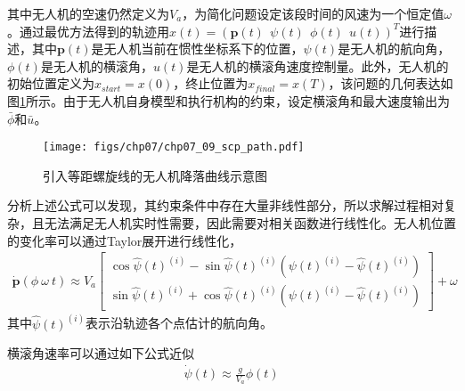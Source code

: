 其中无人机的空速仍然定义为$V_a$，为简化问题设定该段时间的风速为一个恒定值$\omega$。通过最优方法得到的轨迹用$x(t) = (\mathbf{p}(t)\ \ \psi(t)\ \ \phi(t)\ \ u(t) )^T$进行描述，其中$\mathbf{p}(t)$是无人机当前在惯性坐标系下的位置，$\psi(t)$是无人机的航向角，$\phi(t)$是无人机的横滚角，$u(t)$是无人机的横滚角速度控制量。此外，无人机的初始位置定义为$x_{start}=x(0)$，终止位置为$x_{final}=x(T)$，该问题的几何表达如图\ref{fig:chp07_09_scp_path}所示。由于无人机自身模型和执行机构的约束，设定横滚角和最大速度输出为$\bar{\phi}$和$\bar{u}$。
\begin{figure}[ht]   
	\centering
	\texttt{[image: figs/chp07/chp07\_09\_scp\_path.pdf]}
	\caption{引入等距螺旋线的无人机降落曲线示意图}
	\label{fig:chp07_09_scp_path}
\end{figure}

分析上述公式可以发现，其约束条件中存在大量非线性部分，所以求解过程相对复杂，且无法满足无人机实时性需要，因此需要对相关函数进行线性化。无人机位置的变化率可以通过Taylor展开进行线性化，
\begin{align} {\dot{\mathbf{p}}(\phi\ \omega\ t) \approx {V}_a \begin{bmatrix} \cos \hat{\psi}(t)^{(i)} - \sin\hat{\psi}(t)^{(i)} ({\psi}(t)^{(i)} - \hat{\psi}(t)^{(i)}) \\ \sin \hat{\psi}(t)^{(i)}+ \cos \hat{\psi}(t)^{(i)}({\psi}(t)^{(i)} - \hat{\psi}(t)^{(i)})  \end{bmatrix} + \omega}
\end{align}
其中$\hat{\psi}(t)^{(i)}$表示沿轨迹各个点估计的航向角。

横滚角速率可以通过如下公式近似
\begin{align}
	\dot{\psi}(t) \approx \frac{g}{V_a} \phi(t)
\end{align}

